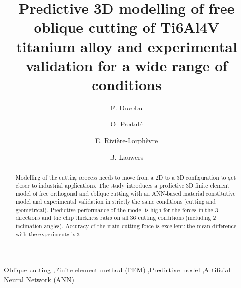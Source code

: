 \documentclass[final,5p,times,twocolumn]{elsarticle}
\begin{document}
\begin{frontmatter}

\title{Predictive 3D modelling of free oblique cutting of Ti6Al4V titanium alloy and experimental validation for a wide range of conditions}

\author[1]{F. Ducobu}

\author[2]{O. Pantal\'{e}}
\author[1]{E. Rivi\`{e}re-Lorph\`{e}vre}
\author[3]{B. Lauwers}

\address[1]{Machine Design and Production Engineering Lab, Research Institute for Science and Material Engineering, UMONS, Belgium}
\address[2]{Laboratoire G\'{e}nie de Production, INP/ENIT, Universit\'{e} de Toulouse, Tarbes, France}
\address[3]{Department of Mechanical Engineering, KU Leuven \& Flanders Make@KU Leuven-MaPS, Belgium}

\begin{abstract}

Modelling of the cutting process needs to move from a 2D to a 3D configuration to get closer to industrial applications. The study introduces a predictive 3D finite element model of free orthogonal and oblique cutting with an ANN-based material constitutive model and experimental validation in strictly the same conditions (cutting and geometrical). Predictive performance of the model is high for the forces in the 3 directions and the chip thickness ratio on all 36 cutting conditions (including 2 inclination angles). Accuracy of the main cutting force is excellent: the mean difference with the experiments is 3%

\end{abstract}

\begin{keyword}

Oblique cutting \sep Finite element method (FEM) \sep Predictive model \sep Artificial Neural Network (ANN)

\end{keyword}

\end{frontmatter}

\linenumbers

\end{document}
